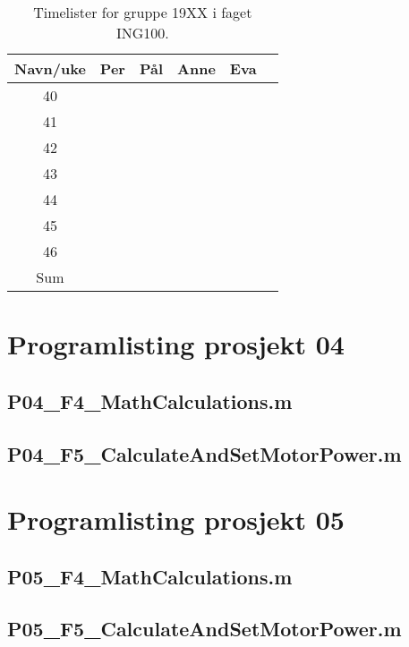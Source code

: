 \documentclass[11pt,a4]{report}
\begin{document}
\begin{table}[H]
	\centering
	\caption{Timelister for gruppe 19XX i faget ING100.}
              \begin{tabular}{|c|c|c|c|c|c|}\hline
                Navn/uke & Per & Pål 
                &  Anne & Eva\\\hline\hline 
	        40 & & & &  \\\hline
	        41 & & & &  \\\hline
	        42 & & & &  \\\hline
	        43 & & & &  \\\hline
	        44 & & & &  \\\hline
	        45 & & & &  \\\hline
	        46 & & & &  \\\hline\hline
	        Sum & & & &  \\\hline
	\end{tabular}
	\label{tab:timeliste}
\end{table}

\chapter{Programlisting prosjekt 04}\label{ch:vedlegg_B}

\section{P04\_F4\_MathCalculations.m}
\section{P04\_F5\_CalculateAndSetMotorPower.m}

\chapter{Programlisting prosjekt 05}\label{ch:vedlegg_C}
\section{P05\_F4\_MathCalculations.m}
\section{P05\_F5\_CalculateAndSetMotorPower.m}
\end{document}

